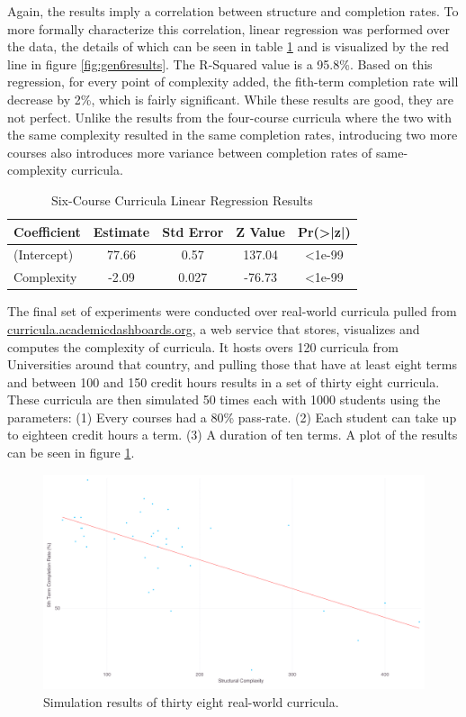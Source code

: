 \documentclass[botnum, fleqn]{unmeethesis}
\begin{document}
    Again, the results imply a correlation between structure and completion rates. To more formally characterize this correlation, linear regression was performed over the data, the details of which can be seen in table \ref{tab:gen6reg} and is visualized by the red line in figure \ref{fig:gen6results}. The R-Squared value is a 95.8\%. Based on this regression, for every point of complexity added, the fith-term completion rate will decrease by 2\%, which is fairly significant. While these results are good, they are not perfect. Unlike the results from the four-course curricula where the two with the same complexity resulted in the same completion rates, introducing two more courses also introduces more variance between completion rates of same-complexity curricula.

    \begin{table}[!h]
      \centering
      \caption{Six-Course Curricula Linear Regression Results}
      \label{tab:gen6reg}
      \begin{tabular}{l*{4}{c}}
        Coefficient & Estimate  & Std Error & Z Value & Pr(>|z|) \\
        \hline
        (Intercept) & 77.66     & 0.57      & 137.04  & <1e-99 \\
        Complexity  & -2.09     & 0.027     & -76.73  & <1e-99 \\
      \end{tabular}
    \end{table}

    The final set of experiments were conducted over real-world curricula pulled from \href{http://curricula.academicdashboards.org}{curricula.academicdashboards.org}, a web service that stores, visualizes and computes the complexity of curricula. It hosts overs 120 curricula from Universities around that country, and pulling those that have at least eight terms and between 100 and 150 credit hours results in a set of thirty eight curricula. These curricula are then simulated 50 times each with 1000 students using the parameters: (1) Every courses had a 80\% pass-rate. (2) Each student can take up to eighteen credit hours a term. (3) A duration of ten terms. A plot of the results can be seen in figure \ref{fig:web10}. 

    \begin{figure}[h!]
      \centerline{\includegraphics[scale=0.25]{./figures/gradRate10_v_complexity.png}}
      \caption{Simulation results of thirty eight real-world curricula.} 
      \label{fig:web10}
    \end{figure}
\end{document}
